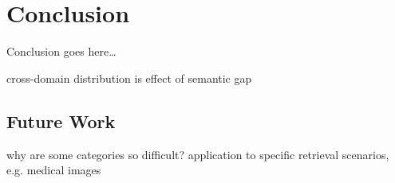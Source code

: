 \chapter{Conclusion}\label{ch:conclusion}

Conclusion goes here\dots

cross-domain distribution is effect of semantic gap

\section{Future Work}

why are some categories so difficult?
application to specific retrieval scenarios, e.g. medical images
